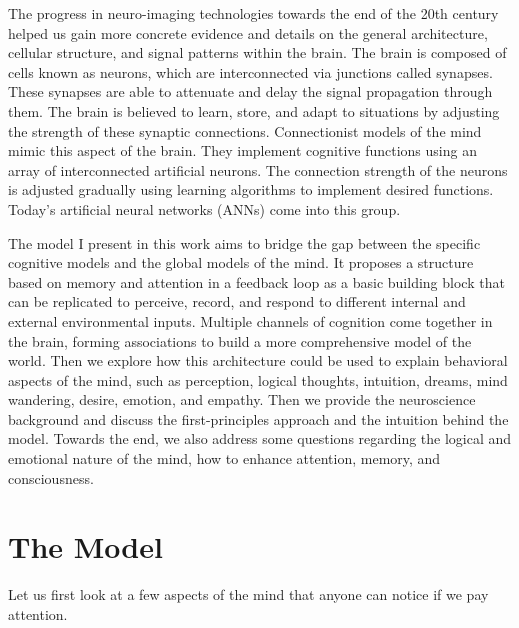 \documentclass[reprint,amsmath,amssymb,apr,aip,onecolumn, 11pt]{revtex4-1}
\begin{document}
	
	The progress in neuro-imaging technologies towards the end of the 20th century helped us gain more concrete evidence and details on the general architecture, cellular structure, and signal patterns within the brain. The brain is composed of cells known as neurons, which are interconnected via junctions called synapses. These synapses are able to attenuate and delay the signal propagation through them. The brain is believed to learn, store, and adapt to situations by adjusting the strength of these synaptic connections. Connectionist models of the mind mimic this aspect of the brain. They implement cognitive functions using an array of interconnected artificial neurons. The connection strength of the neurons is adjusted gradually using learning algorithms to implement desired functions. Today's artificial neural networks (ANNs) come into this group. 
	
	The model I present in this work aims to bridge the gap between the specific cognitive models and the global models of the mind. It proposes a structure based on memory and attention in a feedback loop as a basic building block that can be replicated to perceive, record, and respond to different internal and external environmental inputs. Multiple channels of cognition come together in the brain, forming associations to build a more comprehensive model of the world. Then we explore how this architecture could be used to explain behavioral aspects of the mind, such as perception, logical thoughts, intuition, dreams, mind wandering, desire, emotion, and empathy.  Then we provide the neuroscience background and discuss the first-principles approach and the intuition behind the model. Towards the end, we also address some questions regarding the logical and emotional nature of the mind, how to enhance attention, memory, and consciousness. 
	
	

	
	
	
	\section{The Model }
	Let us first look at a few aspects of the mind that anyone can notice if we pay attention. 
	
\end{document}

